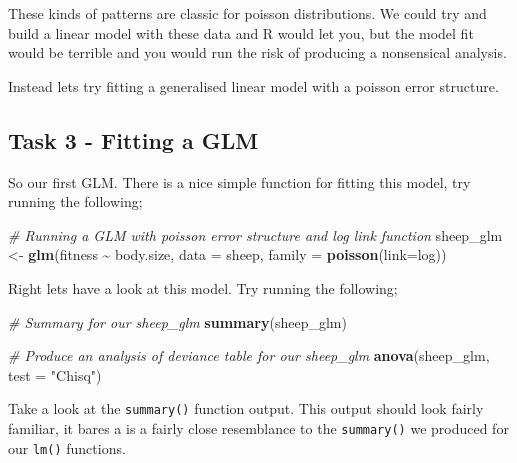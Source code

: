 \documentclass[
]{book}
\newenvironment{Shaded}{\begin{snugshade}}{\end{snugshade}}
\newcommand{\AttributeTok}[1]{\textcolor[rgb]{0.13,0.29,0.53}{#1}}
\newcommand{\CommentTok}[1]{\textcolor[rgb]{0.56,0.35,0.01}{\textit{#1}}}
\newcommand{\FunctionTok}[1]{\textcolor[rgb]{0.13,0.29,0.53}{\textbf{#1}}}
\newcommand{\NormalTok}[1]{#1}
\newcommand{\OtherTok}[1]{\textcolor[rgb]{0.56,0.35,0.01}{#1}}
\newcommand{\SpecialCharTok}[1]{\textcolor[rgb]{0.81,0.36,0.00}{\textbf{#1}}}
\newcommand{\StringTok}[1]{\textcolor[rgb]{0.31,0.60,0.02}{#1}}
\begin{document}
These kinds of patterns are classic for poisson distributions. We could try and build a linear model with these data and R would let you, but the model fit would be terrible and you would run the risk of producing a nonsensical analysis.

Instead lets try fitting a generalised linear model with a poisson error structure.

\hypertarget{task-3---fitting-a-glm}{%
\subsection{Task 3 - Fitting a GLM}\label{task-3---fitting-a-glm}}

So our first GLM. There is a nice simple function for fitting this model, try running the following;

\begin{Shaded}
\begin{Highlighting}[]
\CommentTok{\# Running a GLM with poisson error structure and log link function}
\NormalTok{sheep\_glm }\OtherTok{\textless{}{-}} \FunctionTok{glm}\NormalTok{(fitness }\SpecialCharTok{\textasciitilde{}}\NormalTok{ body.size, }\AttributeTok{data =}\NormalTok{ sheep, }\AttributeTok{family =} \FunctionTok{poisson}\NormalTok{(}\AttributeTok{link=}\NormalTok{log))}
\end{Highlighting}
\end{Shaded}

Right lets have a look at this model. Try running the following;

\begin{Shaded}
\begin{Highlighting}[]
\CommentTok{\# Summary for our sheep\_glm }
\FunctionTok{summary}\NormalTok{(sheep\_glm)}

\CommentTok{\# Produce an analysis of deviance table for our sheep\_glm}
\FunctionTok{anova}\NormalTok{(sheep\_glm, }\AttributeTok{test =} \StringTok{"Chisq"}\NormalTok{)}
\end{Highlighting}
\end{Shaded}

Take a look at the \texttt{summary()} function output. This output should look fairly familiar, it bares a is a fairly close resemblance to the \texttt{summary()} we produced for our \texttt{lm()} functions.
\end{document}
